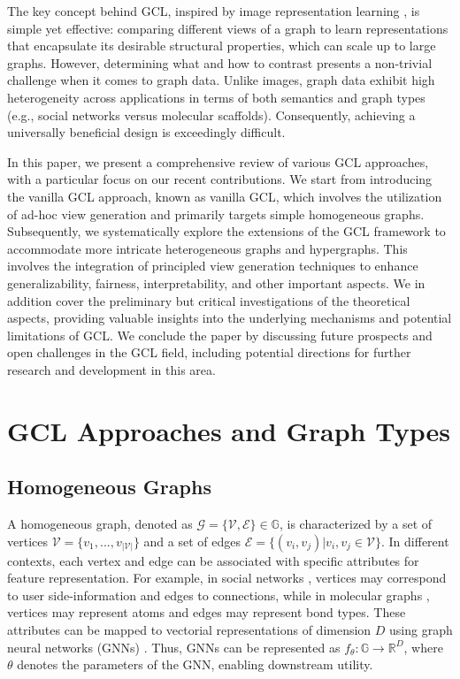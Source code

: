 \documentclass[11pt]{article}
\begin{document}
The key concept behind GCL, inspired by image representation learning \cite{chen2020simple}, is simple yet effective: comparing different views of a graph to learn representations that encapsulate its desirable structural properties, which can scale up to large graphs. However, determining what and how to contrast presents a non-trivial challenge when it comes to graph data. Unlike images, graph data exhibit high heterogeneity across applications in terms of both semantics and graph types (e.g., social networks versus molecular scaffolds). Consequently, achieving a universally beneficial design is exceedingly difficult.

In this paper, we present a comprehensive review of various GCL approaches, with a particular focus on our recent contributions. We start from introducing the vanilla GCL approach, known as vanilla GCL, which involves the utilization of ad-hoc view generation and primarily targets simple homogeneous graphs. Subsequently, we systematically explore the extensions of the GCL framework to accommodate more intricate heterogeneous graphs and hypergraphs. This involves the integration of principled view generation techniques to enhance generalizability, fairness, interpretability, and other important aspects. We in addition cover the preliminary but critical investigations of the theoretical aspects, providing valuable insights into the underlying mechanisms and potential limitations of GCL. We conclude the paper by discussing future prospects and open challenges in the GCL field, including potential directions for further research and development in this area.


\section{GCL Approaches and Graph Types}
\label{sec:gcl_approaches_and_graph_types}
\subsection{Homogeneous Graphs}
\label{sec:homogeneous_graphs}
A homogeneous graph, denoted as $\mathcal{G} = \{\mathcal{V}, \mathcal{E}\} \in \mathbb{G}$, is characterized by a set of vertices $\mathcal{V} = \{v_1, ..., v_{|\mathcal{V}|}\}$ and a set of edges $\mathcal{E} = \{(v_i, v_j) | v_i, v_j \in \mathcal{V}\}$. In different contexts, each vertex and edge can be associated with specific attributes for feature representation. For example, in social networks \cite{mitchell1974social}, vertices may correspond to user side-information and edges to connections, while in molecular graphs \cite{clark2012molecular}, vertices may represent atoms and edges may represent bond types. These attributes can be mapped to vectorial representations of dimension $D$ using graph neural networks (GNNs) \cite{kipf2016semi, velivckovic2017graph, xu2018powerful}. Thus, GNNs can be represented as $f_\theta: \mathbb{G} \rightarrow \mathbb{R}^D$, where $\theta$ denotes the parameters of the GNN, enabling downstream utility.
\end{document}
